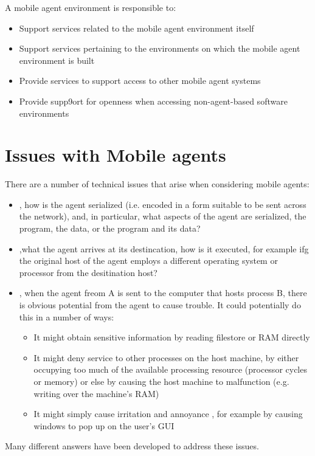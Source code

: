 A mobile agent environment is responsible to:
\begin{itemize}
\item Support services related to the mobile agent environment itself
\item Support services pertaining to the environments on which the mobile agent environment is built
\item Provide services to support access to other mobile agent systems
\item Provide supp9ort for openness when accessing non-agent-based software environments
\end{itemize}

\section{Issues with Mobile agents}
There are a number of technical issues that arise when considering mobile agents:
\begin{itemize}
\item {}, how is the agent serialized (i.e. encoded in a form suitable to be sent across the network), and, in particular, what aspects of the agent are serialized, the program, the data, or the program and its data?
\item {},what the agent arrives at its destincation, how is it executed, for example ifg the original host of the agent employs a different operating system or processor from the desitination host?
\item {}, when the agent freom A is sent to the computer that hosts process B, there is obvious potential from the agent to cause trouble. It could potentially do this in a number of ways:
\begin{itemize}
\item It might obtain sensitive information by reading filestore or RAM directly
\item It might deny service to other processes on the host machine, by either occupying too much of the available processing resource (processor cycles or memory) or else by causing the host machine to malfunction (e.g. writing over the machine's RAM)
\item It might simply cause irritation and annoyance , for example by causing windows to pop up on the user's GUI
\end{itemize}
\end{itemize}
Many different answers have been developed to address these issues.


